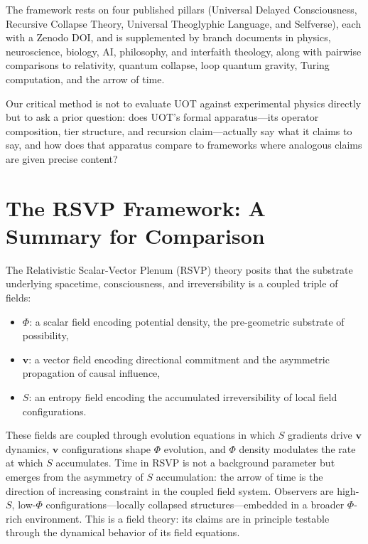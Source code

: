 \documentclass[12pt, oneside]{article}
\theoremstyle{plain-remark}
\newcommand{\Phif}{\Phi}
\newcommand{\vf}{\mathbf{v}}
\newcommand{\Sf}{S}
\begin{document}
The framework rests on four published pillars (Universal Delayed Consciousness, Recursive
Collapse Theory, Universal Theoglyphic Language, and Selfverse), each with a Zenodo DOI,
and is supplemented by branch documents in physics, neuroscience, biology, AI, philosophy,
and interfaith theology, along with pairwise comparisons to relativity, quantum collapse,
loop quantum gravity, Turing computation, and the arrow of time.

Our critical method is not to evaluate UOT against experimental physics directly but to
ask a prior question: does UOT's formal apparatus---its operator composition, tier
structure, and recursion claim---actually say what it claims to say, and how does that
apparatus compare to frameworks where analogous claims are given precise content?


\section{The RSVP Framework: A Summary for Comparison}

The Relativistic Scalar-Vector Plenum (RSVP) theory posits that the substrate underlying
spacetime, consciousness, and irreversibility is a coupled triple of fields:

\begin{itemize}
  \item $\Phif$: a scalar field encoding potential density, the pre-geometric
        substrate of possibility,
  \item $\vf$: a vector field encoding directional commitment and the asymmetric
        propagation of causal influence,
  \item $\Sf$: an entropy field encoding the accumulated irreversibility of local
        field configurations.
\end{itemize}

These fields are coupled through evolution equations in which $\Sf$ gradients drive
$\vf$ dynamics, $\vf$ configurations shape $\Phif$ evolution, and $\Phif$ density
modulates the rate at which $\Sf$ accumulates. Time in RSVP is not a background parameter
but emerges from the asymmetry of $\Sf$ accumulation: the arrow of time is the direction
of increasing constraint in the coupled field system. Observers are high-$\Sf$,
low-$\Phif$ configurations---locally collapsed structures---embedded in a broader
$\Phif$-rich environment. This is a field theory: its claims are in principle testable
through the dynamical behavior of its field equations.
\end{document}
